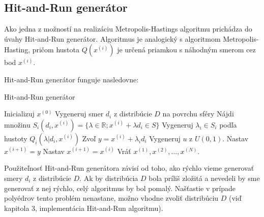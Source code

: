 \subsection{Hit-and-Run generátor}

Ako jedna z možností na realizáciu Metropolis-Hastings algoritmu prichádza do úvahy Hit-and-Run generátor. Algoritmus je analogický s algoritmom Metropolis-Hasting, pričom hustota $Q(x^{(i)})$ je určená priamkou s náhodným smerom cez bod $x^{(i)}$.

Hit-and-Run generátor funguje nasledovne:

\begin{algorithm}[H]
	\caption{Hit-and-Run generátor \cite{hit-and-run_chen}}
	\label{hit-and-run}
	\begin{algorithmic}[1]
		\State Inicializuj $x^{(0)}$
			\State Vygeneruj smer $d_i$ z distribúcie $D$ na povrchu sféry
			\State Nájdi množinu $S_i(d_i,x^{(i)})=\{\lambda \in \mathbb{R}; x^{(i)} + \lambda d_i \in S \} $
			\State Vygeneruj $\lambda_i \in S_i$ podľa hustoty $Q_i(\lambda | d_i, x^{(i)})$
			\State Zvoľ $y=x^{(i)}+\lambda_i d_i$
			\State Vygeneruj $u$ z $U(0,1)$.
				\State Nastav $x^{(i+1)}=y$
			\Else
				\State Nastav $x^{(i+1)}=x^{(i)}$
			\EndIf
		\EndFor
		\State Vráť $x^{(1)},x^{(2)},\dots,x^{(N)}$.
	\end{algorithmic}
\end{algorithm}

Použiteľnosť Hit-and-Run generátora závisí od toho, ako rýchlo vieme generovať smery $d_i$ z distribúcie $D$. Ak by distribúcia $D$ bola príliš zložitá a nevedeli by sme generovať z nej rýchlo, celý algoritmus by bol pomalý.
Našťastie v prípade polyédrov tento problém nenastane, možno vhodne zvoliť distribúciu $D$ (viď kapitola 3, implementácia Hit-and-Run algoritmu).

